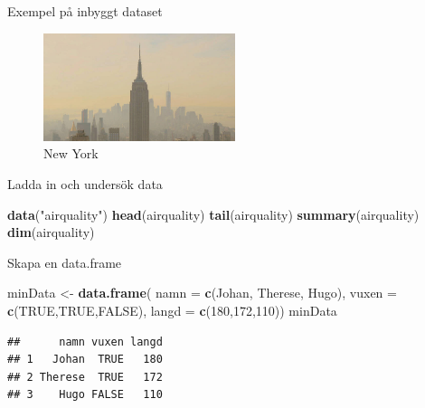 \documentclass[
  11pt,
  ignorenonframetext,
]{beamer}
\newenvironment{Shaded}{\begin{snugshade}}{\end{snugshade}}
\newcommand{\DataTypeTok}[1]{\textcolor[rgb]{0.13,0.29,0.53}{#1}}
\newcommand{\DecValTok}[1]{\textcolor[rgb]{0.00,0.00,0.81}{#1}}
\newcommand{\KeywordTok}[1]{\textcolor[rgb]{0.13,0.29,0.53}{\textbf{#1}}}
\newcommand{\NormalTok}[1]{#1}
\newcommand{\OtherTok}[1]{\textcolor[rgb]{0.56,0.35,0.01}{#1}}
\newcommand{\StringTok}[1]{\textcolor[rgb]{0.31,0.60,0.02}{#1}}
\begin{document}
\begin{frame}[fragile]{Exempel på inbyggt dataset}
\protect\hypertarget{exempel-puxe5-inbyggt-dataset}{}
\begin{figure}
\centering
\includegraphics[width=0.5\textwidth,height=\textheight]{images/ny.jpeg}
\caption{New York}
\end{figure}

Ladda in och undersök data

\begin{Shaded}
\begin{Highlighting}[]
\KeywordTok{data}\NormalTok{(}\StringTok{"airquality"}\NormalTok{)}
\KeywordTok{head}\NormalTok{(airquality)}
\KeywordTok{tail}\NormalTok{(airquality)}
\KeywordTok{summary}\NormalTok{(airquality)}
\KeywordTok{dim}\NormalTok{(airquality)}
\end{Highlighting}
\end{Shaded}
\end{frame}

\begin{frame}[fragile]{Skapa en data.frame}
\protect\hypertarget{skapa-en-data.frame}{}
\begin{Shaded}
\begin{Highlighting}[]
\NormalTok{minData \textless{}{-}}\StringTok{ }\KeywordTok{data.frame}\NormalTok{(}
  \DataTypeTok{namn =} \KeywordTok{c}\NormalTok{(}\StringTok{\textquotesingle{}Johan\textquotesingle{}}\NormalTok{, }\StringTok{\textquotesingle{}Therese\textquotesingle{}}\NormalTok{, }\StringTok{\textquotesingle{}Hugo\textquotesingle{}}\NormalTok{), }
  \DataTypeTok{vuxen =} \KeywordTok{c}\NormalTok{(}\OtherTok{TRUE}\NormalTok{,}\OtherTok{TRUE}\NormalTok{,}\OtherTok{FALSE}\NormalTok{), }
  \DataTypeTok{langd =} \KeywordTok{c}\NormalTok{(}\DecValTok{180}\NormalTok{,}\DecValTok{172}\NormalTok{,}\DecValTok{110}\NormalTok{))}
\NormalTok{minData}
\end{Highlighting}
\end{Shaded}

\begin{verbatim}
##      namn vuxen langd
## 1   Johan  TRUE   180
## 2 Therese  TRUE   172
## 3    Hugo FALSE   110
\end{verbatim}
\end{frame}
\end{document}
